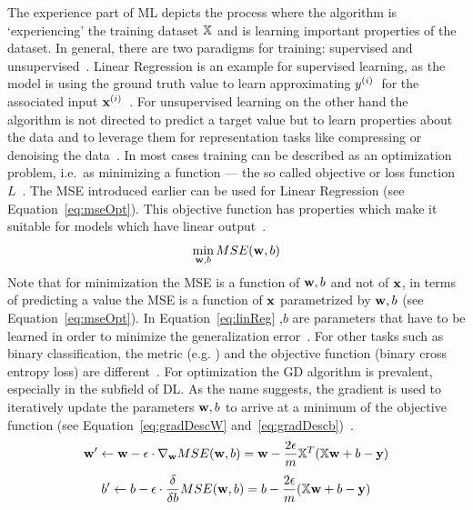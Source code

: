 The experience part of \ac{ML} depicts the process where the algorithm is `experiencing' the training
dataset $\mathbb{X}$ and is learning important properties of the dataset.
In general, there are two paradigms for training: supervised and
unsupervised~\citep{goodfellow_deep_2016}.
Linear Regression is an example for supervised learning, as the model is using the ground truth value
to learn approximating $y^{(i)}$\ for the associated input
$\textbf{x}^{(i)}$~\citep{alzubi_machine_2018,goodfellow_deep_2016}.
For unsupervised learning on the other hand the algorithm is not directed to predict a target
value but to learn properties about the data and to leverage them for representation tasks
like compressing or denoising the data~\citep{goodfellow_deep_2016,geron_hands-machine_2017}.
In most cases training can be described as an optimization problem, i.e.\ as minimizing a
function --- the so called objective or loss function $L$~\citep{goodfellow_deep_2016}.
The MSE introduced earlier can be used for Linear Regression (see Equation~\ref{eq:mseOpt}).
This objective function has properties which make it suitable for models which have linear
output~\citep{goodfellow_deep_2016}.
\begin{equation}\label{eq:mseOpt}
    \min_{\textbf{w},b} MSE(\textbf{w},b)
\end{equation}
Note that for minimization the MSE is a function of $\textbf{w},b$ and not of $\textbf{x}$, in terms of
predicting a value the MSE is a function of $\textbf{x}$ parametrized by $\textbf{w},b$ (see Equation~\ref{eq:mseOpt}).
In Equation~\ref{eq:linReg} \w,$b$ are parameters that have to be learned in order to minimize
the generalization error~\citep{james_introduction_2013,geron_hands-machine_2017}.
For other tasks such as binary classification, the metric (e.g. \fone) and the
objective function (binary cross entropy loss) are different~\citep{geron_hands-machine_2017,
ho_real-world-weight_2020}.
For optimization the \ac{GD} algorithm is prevalent, especially in the subfield of \ac{DL}.
As the name suggests, the gradient is used to iteratively update the parameters $\textbf{w},b$ to arrive
at a minimum of the objective function (see Equation~\ref{eq:gradDescW}
and~\ref{eq:gradDescb})~\citep{geron_hands-machine_2017}.
\begin{equation}\label{eq:gradDescW}
    \textbf{w}'\leftarrow \textbf{w}-\epsilon\cdot\nabla_{\textbf{w}} MSE(\textbf{w},b) = \textbf{w}-\frac{2\epsilon}{m}\mathbb{X}^T (\mathbb{X}\textbf{w}+b-\textbf{y})
\end{equation}
\begin{equation}\label{eq:gradDescb}
    b'\leftarrow b-\epsilon\cdot\frac{\delta}{\delta b} MSE(\textbf{w},b) = b-\frac{2\epsilon}{m}(\mathbb{X}\textbf{w}+b-\textbf{y})
\end{equation}


